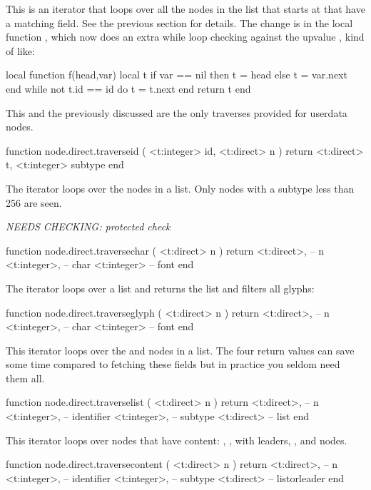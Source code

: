 This is an iterator that loops over all the nodes in the list that starts at
 that have a matching  field. See the previous section for
details. The change is in the local function , which now does an extra
while loop checking against the upvalue , kind of like:

\starttyping
local function f(head,var)
    local t
    if var == nil then
        t = head
    else
        t = var.next
    end
    while not t.id == id do
        t = t.next
    end
    return t
end
\stoptyping

This and the previously discussed  are the only traverses
provided for userdata nodes.

\starttyping[option=LUA]
function node.direct.traverseid ( <t:integer> id, <t:direct> n )
    return
        <t:direct>  t,
        <t:integer> subtype
end
\stoptyping

The  iterator loops over the  nodes in a list.
Only nodes with a subtype less than 256 are seen.

{\em NEEDS CHECKING: protected check}

\starttyping[option=LUA]
function node.direct.traversechar ( <t:direct> n )
    return
        <t:direct>,  -- n
        <t:integer>, -- char
        <t:integer>  -- font
end
\stoptyping

The  iterator loops over a list and returns the list and
filters all glyphs:

\starttyping[option=LUA]
function node.direct.traverseglyph ( <t:direct> n )
    return
        <t:direct>,  -- n
        <t:integer>, -- char
        <t:integer>  -- font
end
\stoptyping

This iterator loops over the  and  nodes in a list. The
four return values can save some time compared to fetching these fields but in
practice you seldom need them all.

\starttyping[option=LUA]
function node.direct.traverselist ( <t:direct> n )
    return
        <t:direct>,  -- n
        <t:integer>, -- identifier
        <t:integer>, -- subtype
        <t:direct>   -- list
end
\stoptyping

This iterator loops over nodes that have content: , ,
 with leaders, ,  and  nodes.

\starttyping[option=LUA]
function node.direct.traversecontent ( <t:direct> n )
    return
        <t:direct>,  -- n
        <t:integer>, -- identifier
        <t:integer>, -- subtype
        <t:direct>   -- listorleader
end
\stoptyping

